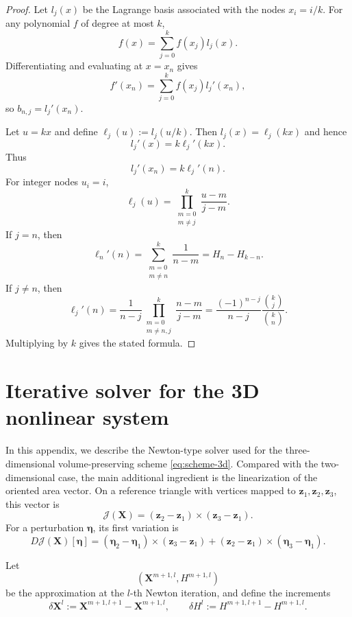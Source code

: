\documentclass[smallextended]{svjour3}
\numberwithin{equation}{section}
\begin{document}
	\begin{proof}
		Let $l_j(x)$ be the Lagrange basis associated with the nodes $x_i=i/k$. For any polynomial $f$ of degree at most $k$,
		\[
		f(x)=\sum_{j=0}^{k} f(x_j)l_j(x).
		\]
		Differentiating and evaluating at $x=x_n$ gives
		\[
		f'(x_n)=\sum_{j=0}^{k}f(x_j)l_j'(x_n),
		\]
		so $b_{n,j}=l_j'(x_n)$.
		
		Let $u=kx$ and define $\ell_j(u):=l_j(u/k)$. Then $l_j(x)=\ell_j(kx)$ and hence
		\[
		l_j'(x)=k\ell_j'(kx).
		\]
		Thus
		\[
		l_j'(x_n)=k\ell_j'(n).
		\]
		For integer nodes $u_i=i$,
		\[
		\ell_j(u)=\prod_{\substack{m=0\\m\ne j}}^{k}\frac{u-m}{j-m}.
		\]
		If $j=n$, then
		\[
		\ell_n'(n)=
		\sum_{\substack{m=0\\m\ne n}}^{k}\frac{1}{n-m}
		=
		H_n-H_{k-n}.
		\]
		If $j\ne n$, then
		\[
		\ell_j'(n)
		=
		\frac{1}{n-j}
		\prod_{\substack{m=0\\m\ne n,j}}^{k}
		\frac{n-m}{j-m}
		=
		\frac{(-1)^{n-j}}{n-j}
		\frac{\binom{k}{j}}{\binom{k}{n}}.
		\]
		Multiplying by $k$ gives the stated formula.
	\end{proof}
	
	\section{Iterative solver for the 3D nonlinear system}
	\label{app:solver-3d}
	
	In this appendix, we describe the Newton-type solver used for the three-dimensional volume-preserving scheme \eqref{eq:scheme-3d}. Compared with the two-dimensional case, the main additional ingredient is the linearization of the oriented area vector. On a reference triangle with vertices mapped to $\mathbf z_1,\mathbf z_2,\mathbf z_3$, this vector is
	\[
	\mathcal J(\mathbf X)
	=
	(\mathbf z_2-\mathbf z_1)\times(\mathbf z_3-\mathbf z_1).
	\]
	For a perturbation $\boldsymbol\eta$, its first variation is
	\begin{equation}
		D\mathcal J(\mathbf X)[\boldsymbol\eta]
		=
		(\boldsymbol\eta_2-\boldsymbol\eta_1)\times(\mathbf z_3-\mathbf z_1)
		+
		(\mathbf z_2-\mathbf z_1)\times(\boldsymbol\eta_3-\boldsymbol\eta_1).
		\label{eq:DJ-3d}
	\end{equation}
	
	Let
	\[
	(\mathbf{X}^{m+1,l},H^{m+1,l})
	\]
	be the approximation at the $l$-th Newton iteration, and define the increments
	\[
	\delta\mathbf{X}^{l}
	:=
	\mathbf{X}^{m+1,l+1}-\mathbf{X}^{m+1,l},
	\qquad
	\delta H^{l}
	:=
	H^{m+1,l+1}-H^{m+1,l}.
	\]
	
\end{document}
